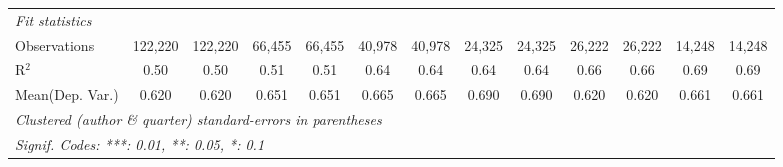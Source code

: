 \begin{tabular}{lcccccccccccc}
   \midrule
   \emph{Fit statistics}\\
   Observations                             & 122,220       & 122,220        & 66,455        & 66,455         & 40,978       & 40,978          & 24,325         & 24,325       & 26,222       & 26,222  & 14,248       & 14,248\\  
   R$^2$                                    & 0.50          & 0.50           & 0.51          & 0.51           & 0.64         & 0.64            & 0.64           & 0.64         & 0.66         & 0.66    & 0.69         & 0.69\\  
Mean(Dep. Var.) & 0.620 & 0.620 & 0.651 & 0.651 & 0.665 & 0.665 & 0.690 & 0.690 & 0.620 & 0.620 & 0.661 & 0.661 \\
   \midrule \midrule
   \multicolumn{13}{l}{\emph{Clustered (author \& quarter) standard-errors in parentheses}}\\
   \multicolumn{13}{l}{\emph{Signif. Codes: ***: 0.01, **: 0.05, *: 0.1}}\\
\end{tabular}
\par\endgroup
